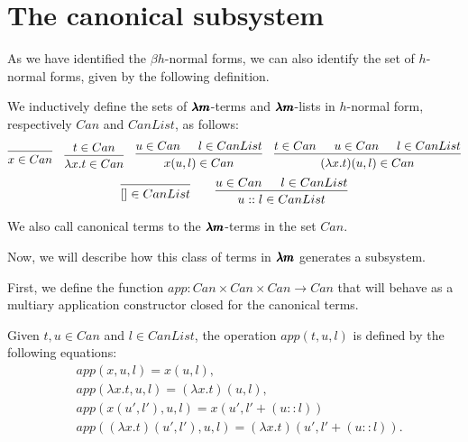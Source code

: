 
\section{The canonical subsystem}

As we have identified the $\beta h$-normal forms, we can also identify the set of $h$-normal forms, given by the following definition.

\begin{definition}
  We inductively define the sets of $\pmb{\lambda m}$-terms and $\pmb{\lambda m}$-lists in $h$-normal form, respectively $Can$ and $CanList$, as follows:
  \[
    \begin{prooftree}
      \infer0{ x \in Can } 
    \end{prooftree}
    \quad
    \begin{prooftree}
      \hypo{ t \in Can }
      \infer1{ \lambda x . t \in Can } 
    \end{prooftree}
    \quad
    \begin{prooftree}
      \hypo{ u \in Can }            
      \hypo{ l \in CanList }
      \infer2{ x(u, l) \in Can }
    \end{prooftree}
    \quad
    \begin{prooftree}
      \hypo{ t \in Can } 
      \hypo{ u \in Can }            
      \hypo{ l \in CanList }
      \infer3{ (\lambda x. t)(u, l) \in Can }
    \end{prooftree}
  \]
  \[
    \begin{prooftree}
      \infer0{ [] \in CanList } 
    \end{prooftree}
    \qquad
    \begin{prooftree}
      \hypo{ u \in Can }            
      \hypo{ l \in CanList }
      \infer2{ u::l \in CanList }
    \end{prooftree}
  \]

  We also call canonical terms to the $\pmb{\lambda m}$-terms in the set $Can$.
\end{definition}

Now, we will describe how this class of terms in $\pmb{\lambda m}$ generates a subsystem.

First, we define the function $app : Can \times Can \times Can \to Can$ that will behave as a multiary application constructor closed for the canonical terms.

\begin{definition}
  Given $t, u \in Can$ and $l \in CanList$, the operation $app(t, u, l)$ is defined by the following equations:
  \begin{align*}
    & app(x, u, l) = x(u, l), \\
    & app(\lambda x. t, u, l) = (\lambda x. t)(u, l), \\ 
    & app(x(u', l'), u, l) = x(u', l' + (u::l)) \\
    & app((\lambda x. t)(u', l'), u, l) = (\lambda x. t)(u', l'+(u::l)).
  \end{align*}  
\end{definition}

